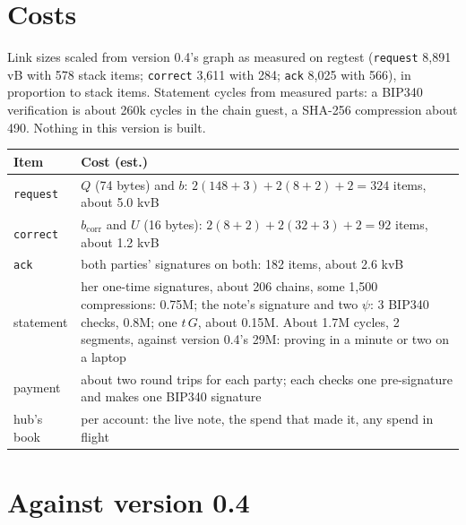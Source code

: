 \documentclass[11pt]{article}
\theoremstyle{plain}
\theoremstyle{definition}
\newcommand{\bcorr}{b_{\mathrm{corr}}}
\newcommand{\tx}[1]{\texttt{#1}}
\begin{document}
\section{Costs}\label{sec:costs}

Link sizes scaled from version 0.4's graph as measured on regtest
(\tx{request} 8,891 vB with 578 stack items; \tx{correct} 3,611 with
284; \tx{ack} 8,025 with 566), in proportion to stack items. Statement
cycles from measured parts: a BIP340 verification is about 260k cycles
in the chain guest, a SHA-256 compression about 490. Nothing in this
version is built.

\begin{center}
\begin{tabularx}{\linewidth}{lL}
\toprule
Item & Cost (est.) \\
\midrule
\tx{request} & $Q$ (74 bytes) and $b$: $2(148 + 3) + 2(8 + 2) + 2 = 324$ items, about 5.0 kvB \\
\tx{correct} & $\bcorr$ and $U$ (16 bytes): $2(8 + 2) + 2(32 + 3) + 2 = 92$ items, about 1.2 kvB \\
\tx{ack} & both parties' signatures on both: 182 items, about 2.6 kvB \\
statement & her one-time signatures, about 206 chains, some 1,500 compressions: 0.75M; the note's signature and two $\psi$: 3 BIP340 checks, 0.8M; one $t\,G$, about 0.15M. About 1.7M cycles, 2 segments, against version 0.4's 29M: proving in a minute or two on a laptop \\
payment & about two round trips for each party; each checks one pre-signature and makes one BIP340 signature \\
hub's book & per account: the live note, the spend that made it, any spend in flight \\
\bottomrule
\end{tabularx}
\end{center}

\section{Against version 0.4}\label{sec:compare}
\end{document}
